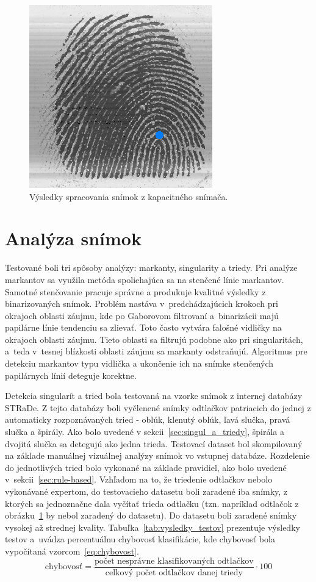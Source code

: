\begin{figure}[h]
    \includegraphics[width=0.32\linewidth]{obrazky-figures/eval_results/capac_singularities.png}
    \caption{Výsledky spracovania snímok z kapacitného snímača.}
    \label{obr:vyhodnotenie_capac}
  \end{figure}

  \section{Analýza snímok}
  Testované boli tri spôsoby analýzy: markanty, singularity a triedy. Pri analýze markantov sa využila metóda spoliehajúca sa na stenčené línie markantov.
  Samotné stenčovanie pracuje správne a produkuje kvalitné výsledky z binarizovaných snímok. Problém nastáva v~predchádzajúcich krokoch pri okrajoch oblasti
  záujmu, kde po Gaborovom filtrovaní a~binarizácii majú papilárne línie tendenciu sa zlievať. Toto často vytvára falošné vidličky na okrajoch oblasti
  záujmu. Tieto oblasti sa filtrujú podobne ako pri singularitách, a~teda v~tesnej blízkosti oblasti záujmu sa markanty odstraňujú.
  Algoritmus pre detekciu markantov typu vidlička a ukončenie ich na snímke stenčených papilárnych línií deteguje korektne.

  Detekcia singularít a tried bola testovaná na vzorke snímok z internej databázy STRaDe. Z tejto databázy boli vyčlenené snímky odtlačkov patriacich do
  jednej z automaticky rozpoznávaných tried - oblúk, klenutý oblúk, ľavá slučka, pravá slučka a špirály. Ako bolo uvedené v sekcii~{\ref{sec:singul_a_triedy}},
  špirála a dvojitá slučka sa detegujú ako jedna trieda. Testovací dataset bol skompilovaný na základe manuálnej vizuálnej analýzy snímok vo vstupnej
  databáze. Rozdelenie do jednotlivých tried bolo vykonané na základe pravidiel, ako bolo uvedené v~sekcii~{\ref{sec:rule-based}}. Vzhľadom na to, že
  triedenie odtlačkov nebolo vykonávané expertom, do testovacieho datasetu boli zaradené iba snímky, z ktorých sa jednoznačne dala vyčítať trieda odtlačku
  (tzn. napríklad odtlačok z obrázku~{\ref{obr:vyhodnotenie_capac}} by nebol zaradený do datasetu).
  Do datasetu boli zaradené snímky vysokej až strednej kvality. Tabuľka~{\ref{tab:vysledky_testov}} prezentuje výsledky testov a~uvádza percentuálnu chybovosť
  klasifikácie, kde chybovosť bola vypočítaná vzorcom~{\ref{eq:chybovost}}.
  \begin{equation}
    \text{chybovosť} = \frac{\text{počet nesprávne klasifikovaných odtlačkov}}{\text{celkový počet odtlačkov danej triedy}} \cdot 100
    \label{eq:chybovost}
  \end{equation}

